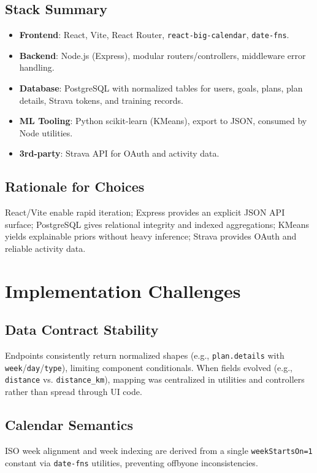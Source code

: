\subsection{Stack Summary}
\begin{itemize}
  \item \textbf{Frontend}: React, Vite, React Router, \texttt{react-big-calendar}, \texttt{date-fns}.
  \item \textbf{Backend}: Node.js (Express), modular routers/controllers, middleware error handling.
  \item \textbf{Database}: PostgreSQL with normalized tables for users, goals, plans, plan details, Strava tokens, and training records.
  \item \textbf{ML Tooling}: Python scikit-learn (KMeans), export to JSON, consumed by Node utilities.
  \item \textbf{3rd-party}: Strava API for OAuth and activity data.
\end{itemize}

\subsection{Rationale for Choices}
React/Vite enable rapid iteration; Express provides an explicit JSON API surface; PostgreSQL gives relational integrity and indexed aggregations; KMeans yields explainable priors without heavy inference; Strava provides OAuth and reliable activity data.

\section{Implementation Challenges}
\subsection{Data Contract Stability}
Endpoints consistently return normalized shapes (e.g., \verb|plan.details| with \verb|week|/\verb|day|/\verb|type|), limiting component conditionals. When fields evolved (e.g., \verb|distance| vs. \verb|distance_km|), mapping was centralized in utilities and controllers rather than spread through UI code.

\subsection{Calendar Semantics}
ISO week alignment and week indexing are derived from a single \verb|weekStartsOn=1| constant via \verb|date-fns| utilities, preventing off\-by\-one inconsistencies.


